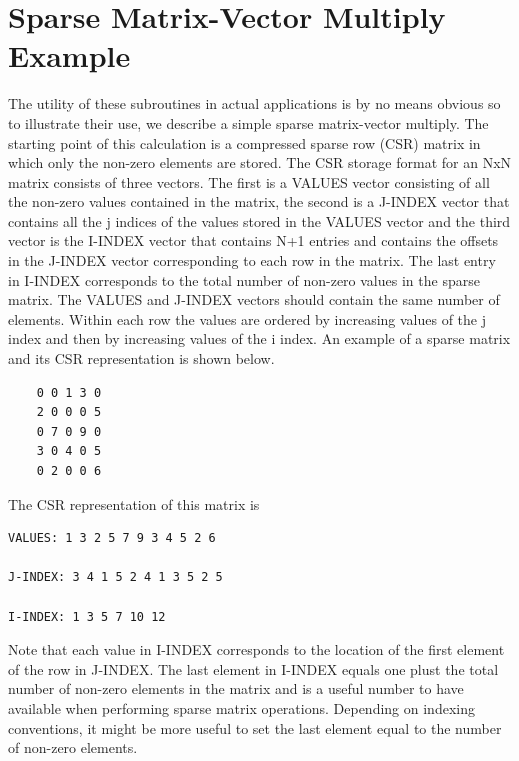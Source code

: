 \section{Sparse Matrix-Vector Multiply Example}

The utility of these subroutines in actual applications is by no means
obvious so to illustrate their use, we describe a simple sparse matrix-vector
multiply. The starting point of this calculation is a compressed sparse
row (CSR) matrix in which only the non-zero elements are stored. The
CSR storage format for an NxN matrix consists of three vectors. The
first is a VALUES vector consisting of all the non-zero values contained
in the matrix, the second is a J-INDEX vector that contains all the
j indices of the values stored in the VALUES vector and the third
vector is the I-INDEX vector that contains N+1 entries and contains
the offsets in the J-INDEX vector corresponding to each row in the
matrix. The last entry in I-INDEX corresponds to the total number
of non-zero values in the sparse matrix. The VALUES and J-INDEX vectors
should contain the same number of elements. Within each row the values
are ordered by increasing values of the j index and then by increasing
values of the i index. An example of a sparse matrix and its CSR representation
is shown below. 
\begin{verbatim}
    0 0 1 3 0
    2 0 0 0 5
    0 7 0 9 0
    3 0 4 0 5
    0 2 0 0 6
\end{verbatim}
The CSR representation of this matrix is
\begin{verbatim}
VALUES: 1 3 2 5 7 9 3 4 5 2 6 

J-INDEX: 3 4 1 5 2 4 1 3 5 2 5 

I-INDEX: 1 3 5 7 10 12
\end{verbatim}
Note that each value in I-INDEX corresponds to the location of the
first element of the row in J-INDEX. The last element in I-INDEX equals
one plust the total number of non-zero elements in the matrix and
is a useful number to have available when performing sparse matrix
operations. Depending on indexing conventions, it might be more useful
to set the last element equal to the number of non-zero elements.

